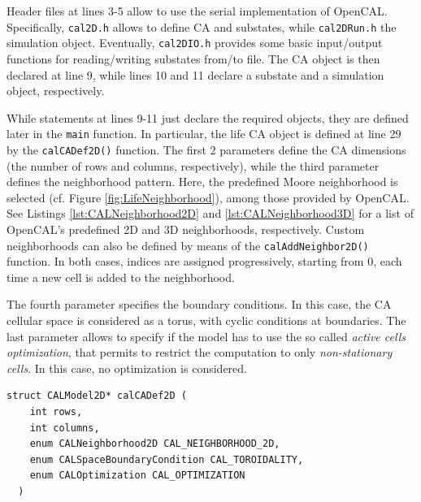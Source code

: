 Header files at lines 3-5 allow to use the serial implementation of
OpenCAL. Specifically, \verb'cal2D.h' allows to define CA and
substates, while \verb'cal2DRun.h' the simulation object. Eventually,
\verb'cal2DIO.h' provides some basic input/output functions for
reading/writing substates from/to file. The CA object is then declared
at line 9, while lines 10 and 11 declare a substate and a simulation
object, respectively.

While statements at lines 9-11 just declare the required objects, they
are defined later in the \verb'main' function. In particular, the life
CA object is defined at line 29 by the \verb'calCADef2D()'
function. The first 2 parameters define the CA dimensions (the number
of rows and columns, respectively), while the third parameter defines
the neighborhood pattern. Here, the predefined Moore neighborhood is
selected (cf. Figure \ref{fig:LifeNeighborhood}), among those provided
by OpenCAL. See Listings \ref{lst:CALNeighborhood2D} and
\ref{lst:CALNeighborhood3D} for a list of OpenCAL's predefined 2D and
3D neighborhoods, respectively. Custom neighborhoods can also be
defined by means of the \verb'calAddNeighbor2D()' function. In both
cases, indices are assigned progressively, starting from 0, each time
a new cell is added to the neighborhood.

The fourth parameter specifies the boundary conditions. In this case,
the CA cellular space is considered as a torus, with cyclic conditions
at boundaries. The last parameter allows to specify if the model has
to use the so called \emph{active cells optimization}, that permits to
restrict the computation to only \emph{non-stationary cells}. In this
case, no optimization is considered.

\begin{lstlisting}[float,floatplacement=H, label=lst:calCADef2D, caption=Definition of the calCADef2D() function., numbers=none]
  struct CALModel2D* calCADef2D (
    int rows,
    int columns,
    enum CALNeighborhood2D CAL_NEIGHBORHOOD_2D,
    enum CALSpaceBoundaryCondition CAL_TOROIDALITY,
    enum CALOptimization CAL_OPTIMIZATION
  )
\end{lstlisting}

